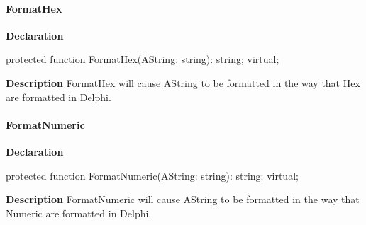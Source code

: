 \documentclass{report}
\newif\ifpdf
\begin{document}
\paragraph*{FormatHex}\hspace*{\fill}

\label{PasDoc_Gen.TDocGenerator-FormatHex}
\begin{list}{}{
\setlength{\itemindent}{0cm}
\setlength{\listparindent}{0cm}
\setlength{\leftmargin}{\evensidemargin}
\addtolength{\leftmargin}{\tmplength}
\settowidth{\labelsep}{X}
\addtolength{\leftmargin}{\labelsep}
\setlength{\labelwidth}{\tmplength}
}
\item[\textbf{Declaration}\hfill]
\ifpdf
\begin{flushleft}
\fi
\begin{ttfamily}
protected function FormatHex(AString: string): string; virtual;\end{ttfamily}

\ifpdf
\end{flushleft}
\fi

\par
\item[\textbf{Description}]
FormatHex will cause AString to be formatted in the way that Hex are formatted in Delphi.

\end{list}
\paragraph*{FormatNumeric}\hspace*{\fill}

\label{PasDoc_Gen.TDocGenerator-FormatNumeric}
\begin{list}{}{
\setlength{\itemindent}{0cm}
\setlength{\listparindent}{0cm}
\setlength{\leftmargin}{\evensidemargin}
\addtolength{\leftmargin}{\tmplength}
\settowidth{\labelsep}{X}
\addtolength{\leftmargin}{\labelsep}
\setlength{\labelwidth}{\tmplength}
}
\item[\textbf{Declaration}\hfill]
\ifpdf
\begin{flushleft}
\fi
\begin{ttfamily}
protected function FormatNumeric(AString: string): string; virtual;\end{ttfamily}

\ifpdf
\end{flushleft}
\fi

\par
\item[\textbf{Description}]
FormatNumeric will cause AString to be formatted in the way that Numeric are formatted in Delphi.

\end{list}
\end{document}
